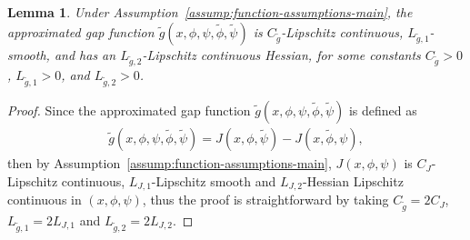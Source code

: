 \documentclass{article}
\theoremstyle{plain}
\newtheorem{lemma}{Lemma}
\theoremstyle{definition}
\theoremstyle{remark}
\begin{document}
\begin{lemma}
    \label{lemma: lipschitz-constants-of-estimated-ni-gap}
    Under Assumption~\ref{assump:function-assumptions-main}, the approximated gap
function $\tilde{g}(x,\phi,\psi,\tilde{\phi},\tilde{\psi})$ is
$C_{\widetilde{g}}$-Lipschitz continuous, $L_{\widetilde{g},1}$-smooth, and
has an $L_{\widetilde{g},2}$-Lipschitz continuous Hessian, for some constants
$C_{\widetilde{g}}>0$, $L_{\widetilde{g},1}>0$, and
$L_{\widetilde{g},2}>0$.
\end{lemma}
\begin{proof}
    Since the approximated gap function $\tilde{g}(x,\phi,\psi,\tilde{\phi},\tilde{\psi})$ is defined as
    \begin{align}
       \tilde{g}(x,\phi,\psi,\tilde{\phi},\tilde{\psi})=J(x,\phi,\tilde{\psi}) - J(x,\tilde{\phi},\psi),
    \end{align}
    then by Assumption~\ref{assump:function-assumptions-main}, $J(x,\phi,\psi)$ is $C_J$-Lipschitz continuous, $L_{J,1}$-Lipschitz smooth and $L_{J,2}$-Hessian Lipschitz continuous in $(x,\phi,\psi)$, thus 
    the proof is straightforward by taking $C_{\widetilde{g}} = 2C_J$, $L_{\widetilde{g},1} = 2L_{J,1}$ and $L_{\widetilde{g},2} = 2L_{J,2}$.
\end{proof}
\end{document}
